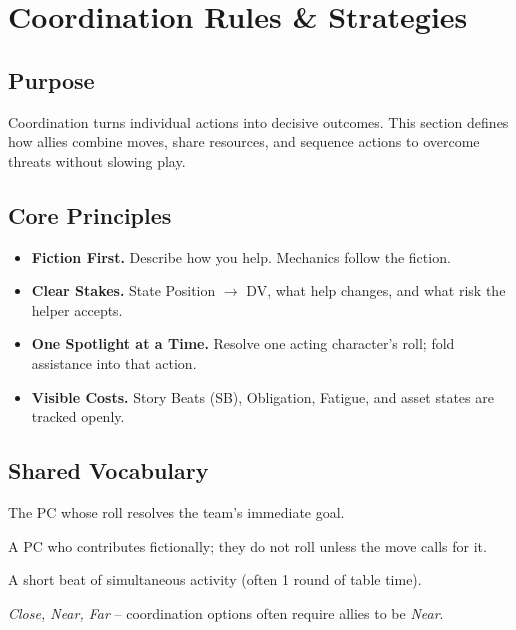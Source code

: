 \section{Coordination Rules \& Strategies}
\label{sec:coordination}

\subsection{Purpose}
Coordination turns individual actions into decisive outcomes. This section defines how allies combine moves, share resources, and sequence actions to overcome threats without slowing play.

\subsection{Core Principles}
\begin{itemize}
  \item \textbf{Fiction First.} Describe how you help. Mechanics follow the fiction.
  \item \textbf{Clear Stakes.} State Position $\to$ DV, what help changes, and what risk the helper accepts.
  \item \textbf{One Spotlight at a Time.} Resolve one acting character's roll; fold assistance into that action.
  \item \textbf{Visible Costs.} Story Beats (SB), Obligation, Fatigue, and asset states are tracked openly.
\end{itemize}

\subsection{Shared Vocabulary}
\begin{description}[leftmargin=1.8em]
  \item[Acting Character] The PC whose roll resolves the team's immediate goal.
  \item[Assistant] A PC who contributes fictionally; they do not roll unless the move calls for it.
  \item[Exchange] A short beat of simultaneous activity (often 1 round of table time).
  \item[Range Bands] \emph{Close, Near, Far} -- coordination options often require allies to be \emph{Near}.
\end{description}

